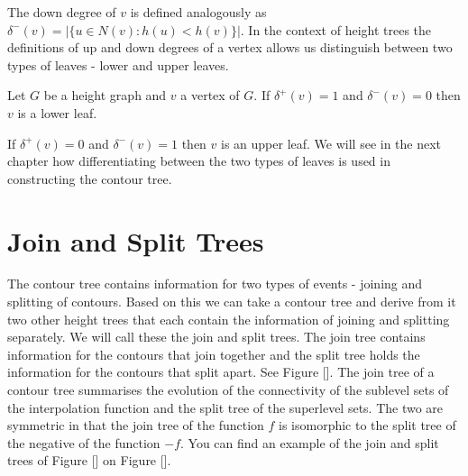 The down degree of $v$ is defined analogously as $\delta^-(v) = \big|\{ u \in N(v) : h(u) < h(v) \}\big|$. In the context of height trees the definitions of up and down degrees of a vertex allows us distinguish between two types of leaves - lower and upper leaves.
\begin{defn} Let $G$ be a height graph and $v$ a vertex of $G$. If  $\delta^+(v) = 1$ and $\delta^-(v) = 0$ then $v$ is a lower leaf.  \end{defn}

If $\delta^+(v) = 0$ and $\delta^-(v) = 1$ then $v$ is an upper leaf. We will see in the next chapter how differentiating between the two types of leaves is used in constructing the contour tree.

\section{Join and Split Trees}

The contour tree contains information for two types of events - joining and splitting of contours. Based on this we can take a contour tree and derive from it two other height trees that each contain the information of joining and splitting separately. We will call these the join and split trees. The join tree contains information for the contours that join together and the split tree holds the information for the contours that split apart. See Figure []. The join tree of a contour tree summarises the evolution of the connectivity of the sublevel sets of the interpolation function and the split tree of the superlevel sets. The two are symmetric in that the join tree of the function $f$ is isomorphic to the split tree of the negative of the function $-f$. You can find an example of the join and split trees of Figure [] on Figure [].



